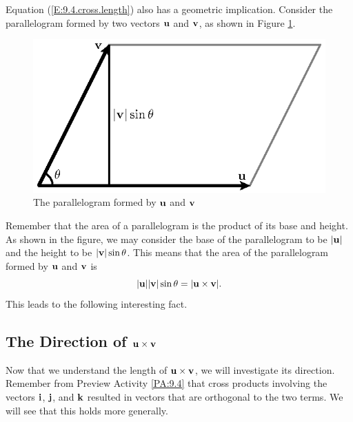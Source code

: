 Equation (\ref{E:9.4.cross.length}) also has a geometric implication.
Consider the parallelogram formed by two vectors $\mathbf{u}$ and $\mathbf{v}$, as
shown in Figure \ref{F:9.4.area}.  

\begin{figure}[ht]
  \begin{center}
    \includegraphics{figures/fig_9_4_area.eps}
    \caption{The parallelogram formed by $\mathbf{u}$ and $\mathbf{v}$}
    \label{F:9.4.area}
  \end{center}
\end{figure}


Remember that the area of a parallelogram is the product of its
base and height.  As shown in the figure, we may consider the base of
the parallelogram to be $|\mathbf{u}|$ and the height to be
$|\mathbf{v}|\sin\theta$.  This means that the area of the parallelogram
formed by $\mathbf{u}$ and $\mathbf{v}$ is 
$$
|\mathbf{u}||\mathbf{v}|\sin\theta = |\mathbf{u}\times\mathbf{v}|.
$$
This leads to the following interesting fact.

\vspace*{5pt}
\nin {} \vspace*{5pt}




\subsection*{The Direction of $\mathbf{u}\times\mathbf{v}$}

Now that we understand the length of $\mathbf{u}\times\mathbf{v}$, we will
investigate its direction.  Remember from Preview Activity
\ref{PA:9.4} that cross products involving the vectors $\mathbf{i}$, $\mathbf{j}$,
and $\mathbf{k}$ resulted in vectors that are orthogonal to the two terms.
We will see that this holds more generally.

